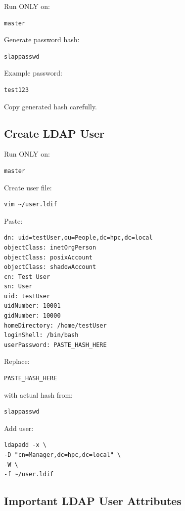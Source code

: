\documentclass[11pt]{article}
\begin{document}
Run ONLY on:

\begin{verbatim}
master
\end{verbatim}

Generate password hash:

\begin{verbatim}
slappasswd
\end{verbatim}

Example password:

\begin{verbatim}
test123
\end{verbatim}

Copy generated hash carefully.
\subsection{Create LDAP User}
\label{sec:orgf036c84}

Run ONLY on:

\begin{verbatim}
master
\end{verbatim}

Create user file:

\begin{verbatim}
vim ~/user.ldif
\end{verbatim}

Paste:

\begin{verbatim}
dn: uid=testUser,ou=People,dc=hpc,dc=local
objectClass: inetOrgPerson
objectClass: posixAccount
objectClass: shadowAccount
cn: Test User
sn: User
uid: testUser
uidNumber: 10001
gidNumber: 10000
homeDirectory: /home/testUser
loginShell: /bin/bash
userPassword: PASTE_HASH_HERE
\end{verbatim}

Replace:

\begin{verbatim}
PASTE_HASH_HERE
\end{verbatim}

with actual hash from:

\begin{verbatim}
slappasswd
\end{verbatim}

Add user:

\begin{verbatim}
ldapadd -x \
-D "cn=Manager,dc=hpc,dc=local" \
-W \
-f ~/user.ldif
\end{verbatim}
\subsection{Important LDAP User Attributes}
\label{sec:org837bfc9}
\end{document}
